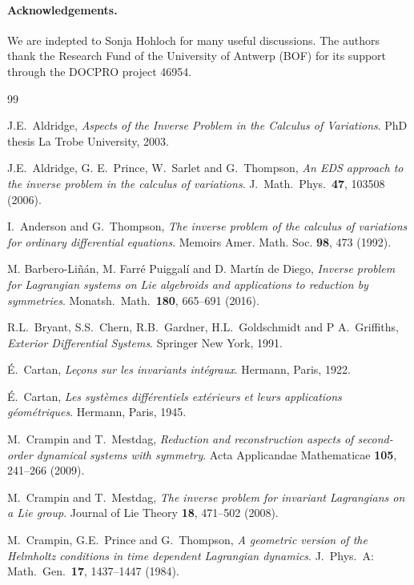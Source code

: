 \documentclass[11pt]{article}
\theoremstyle{plain}
\theoremstyle{definition}
\begin{document}
\paragraph{Acknowledgements.} We are indepted to Sonja Hohloch for many useful discussions. The authors thank the Research Fund of the University of Antwerp (BOF) for its support through the DOCPRO project 46954.

\begin{thebibliography}{99}

 J.E.\ Aldridge, {\em Aspects of the Inverse Problem in the Calculus of Variations}. PhD thesis La Trobe University, 2003.

 J.E.\ Aldridge, G. E.\ Prince, W.\ Sarlet and G.\ Thompson, {\em An EDS approach to the inverse problem in the calculus of variations}. J.\ Math.\ Phys.\ \textbf{47},  103508 (2006).

 I.\ Anderson and G.\ Thompson, {\em The inverse problem of the calculus of variations for ordinary differential equations}. Memoirs Amer. Math. Soc. \textbf{98}, 473 (1992).

 M. Barbero-Liñán, M. Farré Puiggalí and D. Martín de Diego, {\em Inverse problem for Lagrangian systems on Lie algebroids and applications to reduction by symmetries}. Monatsh.\ Math.\ \textbf{180}, 665--691 (2016).

 R.L.\ Bryant,  S.S.\ Chern, R.B.\ Gardner, H.L.\ Goldschmidt and P A.\ Griffiths, {\em Exterior Differential Systems}. Springer New York, 1991.

 {\'E}.\ Cartan, {\em Leçons sur les invariants int{\'e}graux}. Hermann, Paris, 1922.

 {\'E}.\ Cartan, {\em Les syst{\`e}mes diff{\'e}rentiels ext{\'e}rieurs et leurs applications g{\'e}om{\'e}triques}. Hermann, Paris, 1945.

M.\ Crampin and T.\ Mestdag, {\em 
Reduction and reconstruction aspects of second-order
dynamical systems with symmetry}. Acta Applicandae Mathematicae \textbf{105}, 241--266  (2009).  



 M.\ Crampin and T.\ Mestdag, {\em The inverse problem for invariant Lagrangians on a Lie group}. Journal of Lie Theory \textbf{18}, 471--502 (2008).

 M.\ Crampin, G.E.\ Prince and G.\ Thompson, {\em A geometric version of the Helmholtz conditions in time dependent Lagrangian dynamics}. J.\ Phys.\ A: Math.\ Gen.\ \textbf{17}, 1437--1447 (1984).


\end{thebibliography}
\end{document}
